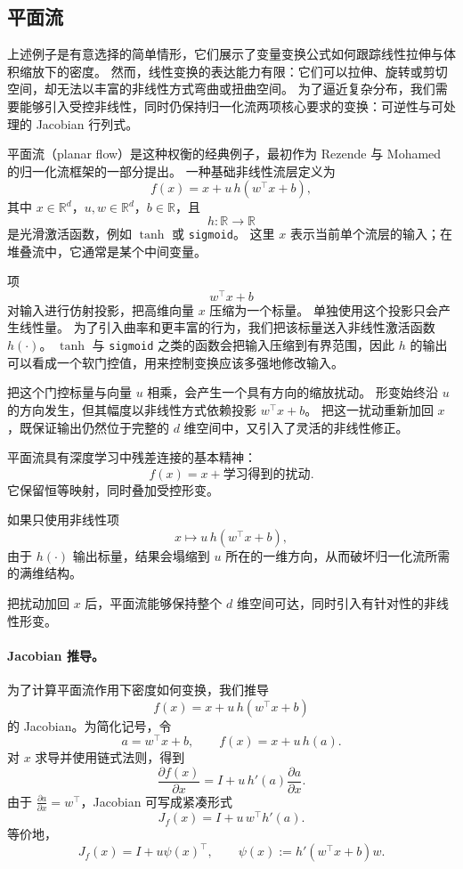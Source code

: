 \subsection{平面流}

上述例子是有意选择的简单情形，它们展示了变量变换公式如何跟踪线性拉伸与体积缩放下的密度。
然而，线性变换的表达能力有限：它们可以拉伸、旋转或剪切空间，却无法以丰富的非线性方式弯曲或扭曲空间。
为了逼近复杂分布，我们需要能够引入受控非线性，同时仍保持归一化流两项核心要求的变换：可逆性与可处理的 Jacobian 行列式。

平面流（planar flow）是这种权衡的经典例子，最初作为 Rezende 与 Mohamed~\cite{rezende2015variational} 的归一化流框架的一部分提出。
一种基础非线性流层定义为
\[
f(x)
=
x+u\,h(w^\top x+b),
\]
其中 $x\in\mathbb{R}^d$，$u,w\in\mathbb{R}^d$，$b\in\mathbb{R}$，且
\[
h:\mathbb{R}\to\mathbb{R}
\]
是光滑激活函数，例如 $\tanh$ 或 \texttt{sigmoid}。
这里 $x$ 表示当前单个流层的输入；在堆叠流中，它通常是某个中间变量。

项
\[
w^\top x+b
\]
对输入进行仿射投影，把高维向量 $x$ 压缩为一个标量。
单独使用这个投影只会产生线性量。
为了引入曲率和更丰富的行为，我们把该标量送入非线性激活函数 $h(\cdot)$。
$\tanh$ 与 \texttt{sigmoid} 之类的函数会把输入压缩到有界范围，因此 $h$ 的输出可以看成一个软门控值，用来控制变换应该多强地修改输入。

把这个门控标量与向量 $u$ 相乘，会产生一个具有方向的缩放扰动。
形变始终沿 $u$ 的方向发生，但其幅度以非线性方式依赖投影 $w^\top x+b$。
把这一扰动重新加回 $x$，既保证输出仍然位于完整的 $d$ 维空间中，又引入了灵活的非线性修正。

\begin{tcolorbox}[
  colback=blue!4,
  colframe=blue!50!black,
  title={残差结构及其动机},
  boxrule=0.6pt,
  arc=2mm,
  left=2mm,
  right=2mm,
  top=1mm,
  bottom=1mm
]
平面流具有深度学习中残差连接的基本精神：
\[
f(x)=x+\text{学习得到的扰动}.
\]
它保留恒等映射，同时叠加受控形变。

如果只使用非线性项
\[
x\mapsto u\,h(w^\top x+b),
\]
由于 $h(\cdot)$ 输出标量，结果会塌缩到 $u$ 所在的一维方向，从而破坏归一化流所需的满维结构。

把扰动加回 $x$ 后，平面流能够保持整个 $d$ 维空间可达，同时引入有针对性的非线性形变。
\end{tcolorbox}

\paragraph{Jacobian 推导。}
为了计算平面流作用下密度如何变换，我们推导
\[
f(x)=x+u\,h(w^\top x+b)
\]
的 Jacobian。为简化记号，令
\[
a=w^\top x+b,
\qquad
f(x)=x+u\,h(a).
\]
对 $x$ 求导并使用链式法则，得到
\[
\frac{\partial f(x)}{\partial x}
=
I+u\,h'(a)\frac{\partial a}{\partial x}.
\]
由于 $\frac{\partial a}{\partial x}=w^\top$，Jacobian 可写成紧凑形式
\[
J_f(x)
=
I+u\,w^\top h'(a).
\]
等价地，
\[
J_f(x)
=
I+u\psi(x)^\top,
\qquad
\psi(x):=h'(w^\top x+b)w.
\]

